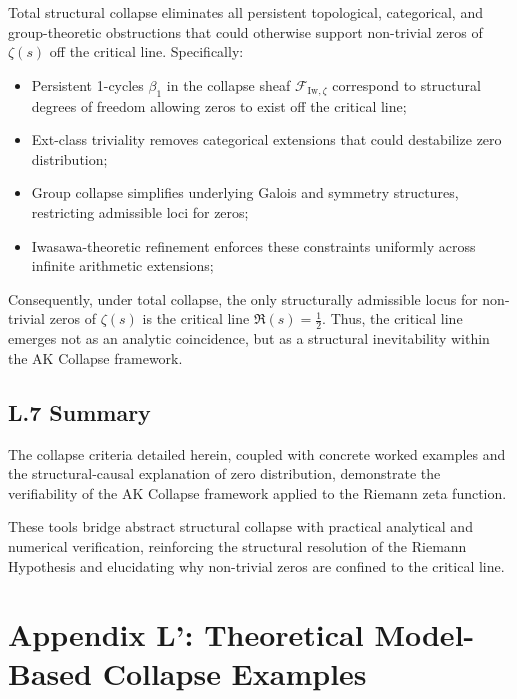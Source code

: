 \documentclass[11pt]{article}
\begin{document}
Total structural collapse eliminates all persistent topological, categorical, and group-theoretic obstructions that could otherwise support non-trivial zeros of $\zeta(s)$ off the critical line. Specifically:

\begin{itemize}
    \item Persistent 1-cycles $\beta_1$ in the collapse sheaf $\mathcal{F}_{\mathrm{Iw}, \zeta}$ correspond to structural degrees of freedom allowing zeros to exist off the critical line;
    \item Ext-class triviality removes categorical extensions that could destabilize zero distribution;
    \item Group collapse simplifies underlying Galois and symmetry structures, restricting admissible loci for zeros;
    \item Iwasawa-theoretic refinement enforces these constraints uniformly across infinite arithmetic extensions;
\end{itemize}

Consequently, under total collapse, the only structurally admissible locus for non-trivial zeros of $\zeta(s)$ is the critical line $\Re(s) = \tfrac{1}{2}$. Thus, the critical line emerges not as an analytic coincidence, but as a structural inevitability within the AK Collapse framework.

\subsection*{L.7 Summary}

The collapse criteria detailed herein, coupled with concrete worked examples and the structural-causal explanation of zero distribution, demonstrate the verifiability of the AK Collapse framework applied to the Riemann zeta function.

These tools bridge abstract structural collapse with practical analytical and numerical verification, reinforcing the structural resolution of the Riemann Hypothesis and elucidating why non-trivial zeros are confined to the critical line.



\section*{Appendix L': Theoretical Model-Based Collapse Examples}
\end{document}
